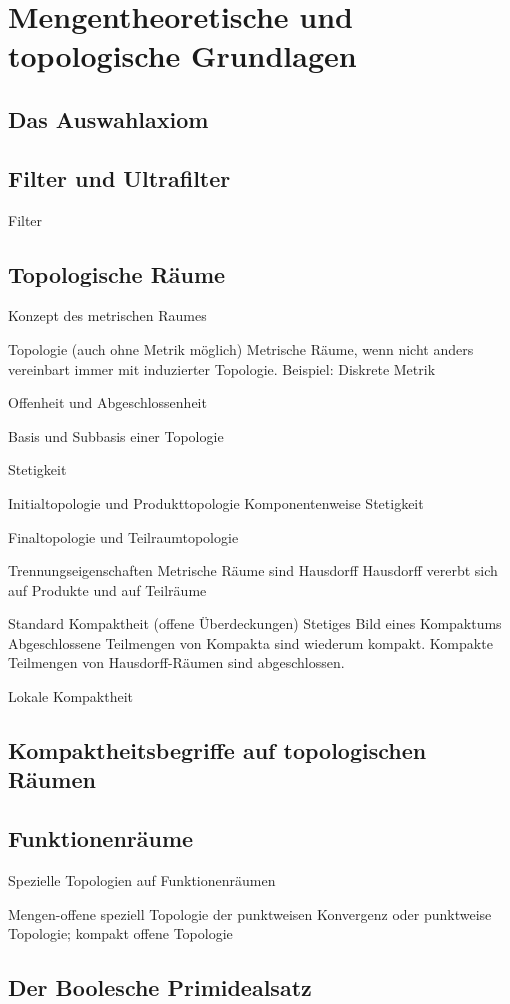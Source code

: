\section{Mengentheoretische und topologische Grundlagen}

\subsection{Das Auswahlaxiom}

\subsection{Filter und Ultrafilter}

\begin{defn}
  Filter
\end{defn}

\subsection{Topologische Räume}

Konzept des metrischen Raumes

Topologie (auch ohne Metrik möglich)
Metrische Räume, wenn nicht anders vereinbart immer mit induzierter Topologie. 
Beispiel: Diskrete Metrik

Offenheit und Abgeschlossenheit

Basis und Subbasis einer Topologie

Stetigkeit

Initialtopologie und Produkttopologie
Komponentenweise Stetigkeit

Finaltopologie und Teilraumtopologie

Trennungseigenschaften
Metrische Räume sind Hausdorff
Hausdorff vererbt sich auf Produkte und auf Teilräume

Standard Kompaktheit (offene Überdeckungen)
Stetiges Bild eines Kompaktums
Abgeschlossene Teilmengen von Kompakta sind wiederum kompakt.
Kompakte Teilmengen von Hausdorff-Räumen sind abgeschlossen.

Lokale Kompaktheit

\subsection{Kompaktheitsbegriffe auf topologischen Räumen}

\subsection{Funktionenräume}

Spezielle Topologien auf Funktionenräumen

Mengen-offene speziell Topologie der punktweisen Konvergenz oder punktweise Topologie; kompakt offene Topologie

\subsection{Der Boolesche Primidealsatz}
